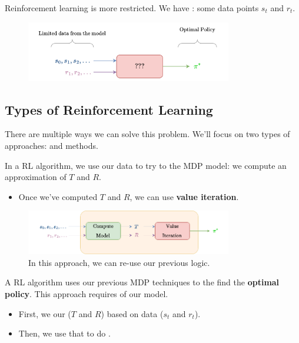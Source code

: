         Reinforcement learning is more restricted. We have : some data points $s_t$ and $r_t$.
        
        \begin{figure}[H]
            \centering
            \includegraphics[width=90mm,scale=0.5]{images/rl_images/reinforcement_learning_unknown.png}
        \end{figure}





    \subsection{Types of Reinforcement Learning}

        There are multiple ways we can solve this problem. We'll focus on two types of approaches:  and  methods.

        In a  RL algorithm, we use our data to try to  the MDP model: we compute an approximation of $T$ and $R$.

        \begin{itemize}
            \item Once we've computed $T$ and $R$, we can use \textbf{value iteration}.
        \end{itemize}

        \begin{figure}[H]
            \centering
            \includegraphics[width=90mm,scale=0.5]{images/rl_images/model_based.png}
            \caption*{In this approach, we can re-use our previous logic.}
        \end{figure}

        \begin{definition}
            A  RL algorithm uses our previous MDP techniques to the find the \textbf{optimal policy}. This approach requires  of our model.

            \begin{itemize}
                \item First, we  our  ($T$ and $R$) based on data ($s_t$ and $r_t$).
                \item Then, we use that to do .
            \end{itemize}
        \end{definition}

